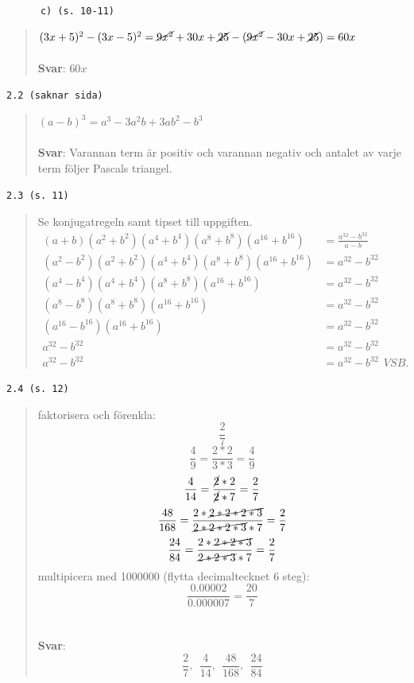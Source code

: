 \documentclass[a4paper]{article}
\newcommand{\tskcol}[1]{\textcolor{tskcol}{#1}}
\begin{document}
	\texttt{\tskcol{~~~~~~c) (s. 10-11)}}
	\begin{quotation}
		$(3x+5)^2-(3x-5)^2=\cancel{9x^2}+30x+\cancel{25}-(\cancel{9x^2}-30x+\cancel{25})=60x$
		\\ \\
		\textbf{Svar}: $60x$
	\end{quotation}
	
	\texttt{\tskcol{2.2 (saknar sida)}}
	\begin{quotation}
		\noindent
		$(a-b)^3=a^3-3a^2b+3ab^2-b^3$ 
		\\ \\
		\textbf{Svar}: Varannan term är positiv och varannan negativ och antalet av varje term följer Pascals triangel.
	\end{quotation}
	
	\texttt{\tskcol{2.3 (s. 11)}}
	\begin{quotation}
		Se konjugatregeln samt tipset till uppgiften.
		\begin{align*}
			(a+b)(a^2+b^2)(a^4+b^4)(a^8+b^8)(a^{16}+b^{16})&=\frac{a^{32}-b^{32}}{a-b} \\
			(a^2-b^2)(a^2+b^2)(a^4+b^4)(a^8+b^8)(a^{16}+b^{16})&=a^{32}-b^{32} \\
			(a^4-b^4)(a^4+b^4)(a^8+b^8)(a^{16}+b^{16})&=a^{32}-b^{32} \\
			(a^8-b^8)(a^8+b^8)(a^{16}+b^{16})&=a^{32}-b^{32} \\
			(a^{16}-b^{16})(a^{16}+b^{16})&=a^{32}-b^{32} \\
			a^{32}-b^{32}&=a^{32}-b^{32} \\
			a^{32}-b^{32}&=a^{32}-b^{32}~~VSB.
		\end{align*}
	\end{quotation}
	
	\texttt{\tskcol{2.4 (s. 12)}}
	\begin{quotation}
		\noindent
		faktorisera och förenkla:
		\[\dfrac{2}{7}\]
		\[\dfrac{4}{9}=\dfrac{2*2}{3*3}=\dfrac{4}{9}\]
		\[\dfrac{4}{14}=\dfrac{\cancel{2}*2}{\cancel{2}*7}=\dfrac{2}{7}\]
		\[\dfrac{48}{168}=\dfrac{2*\cancel{2*2*2*3}}{\cancel{2*2*2*3}*7}=\dfrac{2}{7}\]
		\[\dfrac{24}{84}=\dfrac{2*\cancel{2*2*3}}{\cancel{2*2*3}*7}=\dfrac{2}{7}\]
		multipicera med 1000000 (flytta decimaltecknet 6 steg):
		\[\dfrac{0.00002}{0.000007}=\dfrac{20}{7}\]
		\\ \\
		\textbf{Svar}: \[\frac{2}{7},~~ \frac{4}{14},~~ \frac{48}{168},~~ \frac{24}{84}\]
	\end{quotation}
	
\end{document}
